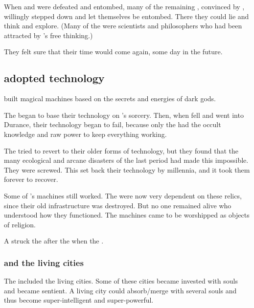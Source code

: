 When \Sethicus and \Tiamat were defeated and entombed, many of the remaining \dragons, convinced by \Nexagglachel, willingly stepped down and let themselves be entombed.
There they could lie and think and explore. 
(Many of the \dragons were scientists and philosophers who had been attracted by \Sethicus's free thinking.)

They felt sure that their time would come again, some day in the future. 









\subsection{\Ophidians adopted \Sethican technology}
\Sethicus built magical machines based on the secrets and energies of dark gods. 

The \ophidians began to base their technology on \Sethicus's sorcery. 
Then, when \Sethicus fell and went into Durance, their technology began to fail, because only the \dragons had the occult knowledge and raw power to keep everything working. 

The \ophidians tried to revert to their older forms of technology, but they found that the many ecological and arcane disasters of the last period had made this impossible. 
They were screwed. 
This set back their technology by millennia, and it took them forever to recover. 

Some of \Sethicus's machines still worked.
The \ophidians were now very dependent on these relics, since their old infrastructure was destroyed. 
But no one remained alive who understood how they functioned.
The machines came to be worshipped as objects of religion.

A  struck the \ophidians after the \Resphan {} when the \resphain {}. 





\subsubsection{\Nithvezurun and the living cities}
The  included the living cities. 
Some of these cities became invested with \ophidian souls and became sentient. 
A living city could absorb/merge with several \ophidian souls and thus become super-intelligent and super-powerful.

